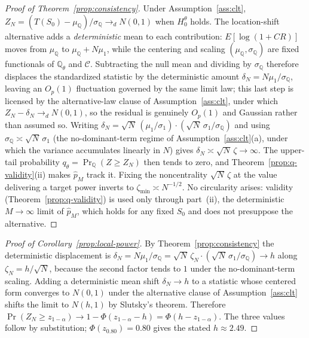 \documentclass[risks,article,submit,pdftex,oneauthor]{Definitions/mdpi}
\begin{document}
\begin{proof}[Proof of Theorem~\ref{prop:consistency}]
Under Assumption~\ref{ass:clt}, $Z_N=(T(S_0)-\mu_{\mathbb Q})/\sigma_{\mathbb
Q}\to_d N(0,1)$ when $H_0^\theta$ holds. The location-shift alternative adds a
\emph{deterministic} mean to each contribution: $E[\log(1+CR)]$ moves from
$\mu_{\mathbb Q}$ to $\mu_{\mathbb Q}+N\mu_1$, while the centering and scaling
$(\mu_{\mathbb Q},\sigma_{\mathbb Q})$ are fixed functionals of $\mathbb{Q}_\theta$
and $\mathcal C$. Subtracting the null mean and dividing by $\sigma_{\mathbb Q}$
therefore displaces the standardized statistic by the deterministic amount
$\delta_N=N\mu_1/\sigma_{\mathbb Q}$, leaving an $O_p(1)$ fluctuation governed by
the same limit law; this last step is licensed by the alternative-law clause of
Assumption~\ref{ass:clt}, under which $Z_N-\delta_N\to_d N(0,1)$, so the residual
is genuinely $O_p(1)$ and Gaussian rather than assumed so. Writing
$\delta_N=\sqrt N\,(\mu_1/\sigma_1)\cdot(\sqrt N\,\sigma_1/\sigma_{\mathbb Q})$ and
using $\sigma_{\mathbb Q}\asymp\sqrt N\,\sigma_1$ (the no-dominant-term regime of
Assumption~\ref{ass:clt}(a), under which the variance accumulates linearly in $N$)
gives $\delta_N\asymp\sqrt N\,\zeta\to\infty$. The upper-tail probability
$q_\theta=\Pr_{\mathbb Q}(Z\ge Z_N)$ then tends to zero, and
Theorem~\ref{prop:q-validity}(ii) makes $\hat p_M$ track it. Fixing the
noncentrality $\sqrt N\,\zeta$ at the value delivering a target power inverts to
$\zeta_{\min}\asymp N^{-1/2}$. No circularity arises: validity
(Theorem~\ref{prop:q-validity}) is used only through part~(ii), the deterministic
$M\to\infty$ limit of $\hat p_M$, which holds for any fixed $S_0$ and does not
presuppose the alternative.
\end{proof}

\begin{proof}[Proof of Corollary~\ref{prop:local-power}]
By Theorem~\ref{prop:consistency} the deterministic displacement is
$\delta_N=N\mu_1/\sigma_{\mathbb Q}=\sqrt N\,\zeta_N\cdot(\sqrt N\,\sigma_1/
\sigma_{\mathbb Q})\to h$ along $\zeta_N=h/\sqrt N$, because the second factor
tends to $1$ under the no-dominant-term scaling. Adding a deterministic mean shift
$\delta_N\to h$ to a statistic whose centered form converges to $N(0,1)$ under the
alternative clause of Assumption~\ref{ass:clt} shifts the limit to $N(h,1)$ by
Slutsky's theorem. Therefore
$\Pr(Z_N\ge z_{1-\alpha})\to1-\Phi(z_{1-\alpha}-h)=\Phi(h-z_{1-\alpha})$. The three
values follow by substitution; $\Phi(z_{0.80})=0.80$ gives the stated
$h\approx2.49$.
\end{proof}
\end{document}

